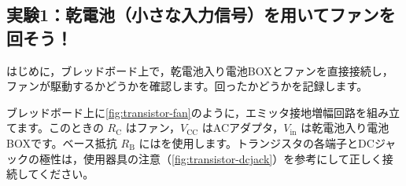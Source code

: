 \subsection{実験1：乾電池（小さな入力信号）を用いてファンを回そう！}

\begin{procedure}[label=\textbf{1.\arabic*}, ref=1.\arabic*, leftmargin=*, labelsep=0.8em]
  \item はじめに，ブレッドボード上で，乾電池入り電池BOXとファンを直接接続し，ファンが駆動するかどうかを確認します。回ったかどうかを記録します。
  \item ブレッドボード上に\cref{fig:transistor-fan}のように，エミッタ接地増幅回路を組み立てます。このときの $R_\mathrm{C}$ はファン，$V_\mathrm{CC}$ はACアダプタ，$V_\mathrm{in}$ は乾電池入り電池BOXです。ベース抵抗 $R_\mathrm{B}$ にはを使用します。トランジスタの各端子とDCジャックの極性は，使用器具の注意（\cref{fig:transistor-dcjack}）を参考にして正しく接続してください。


\end{procedure}
